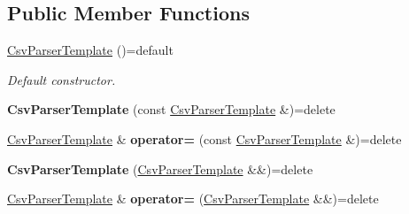 \subsection*{Public Member Functions}
\begin{DoxyCompactItemize}
\item 
\hyperlink{class_mdt_1_1_plain_text_1_1_csv_parser_template_a0365862918b7ffb5e70bfd2fd6a0e95e}{Csv\+Parser\+Template} ()=default
\begin{DoxyCompactList}\small\item\em Default constructor. \end{DoxyCompactList}\item 
{\bfseries Csv\+Parser\+Template} (const \hyperlink{class_mdt_1_1_plain_text_1_1_csv_parser_template}{Csv\+Parser\+Template} \&)=delete\hypertarget{class_mdt_1_1_plain_text_1_1_csv_parser_template_a50df2d2fb8eda54bf9ec1dced98013e3}{}\label{class_mdt_1_1_plain_text_1_1_csv_parser_template_a50df2d2fb8eda54bf9ec1dced98013e3}

\item 
\hyperlink{class_mdt_1_1_plain_text_1_1_csv_parser_template}{Csv\+Parser\+Template} \& {\bfseries operator=} (const \hyperlink{class_mdt_1_1_plain_text_1_1_csv_parser_template}{Csv\+Parser\+Template} \&)=delete\hypertarget{class_mdt_1_1_plain_text_1_1_csv_parser_template_a231614b1287419ebd121c7909802f1a7}{}\label{class_mdt_1_1_plain_text_1_1_csv_parser_template_a231614b1287419ebd121c7909802f1a7}

\item 
{\bfseries Csv\+Parser\+Template} (\hyperlink{class_mdt_1_1_plain_text_1_1_csv_parser_template}{Csv\+Parser\+Template} \&\&)=delete\hypertarget{class_mdt_1_1_plain_text_1_1_csv_parser_template_af7d085875af2f5244958e0cb06daf39b}{}\label{class_mdt_1_1_plain_text_1_1_csv_parser_template_af7d085875af2f5244958e0cb06daf39b}

\item 
\hyperlink{class_mdt_1_1_plain_text_1_1_csv_parser_template}{Csv\+Parser\+Template} \& {\bfseries operator=} (\hyperlink{class_mdt_1_1_plain_text_1_1_csv_parser_template}{Csv\+Parser\+Template} \&\&)=delete\hypertarget{class_mdt_1_1_plain_text_1_1_csv_parser_template_aa7bfc2bddc9d3ae6690d741c2a24550d}{}\label{class_mdt_1_1_plain_text_1_1_csv_parser_template_aa7bfc2bddc9d3ae6690d741c2a24550d}


\end{DoxyCompactItemize}
